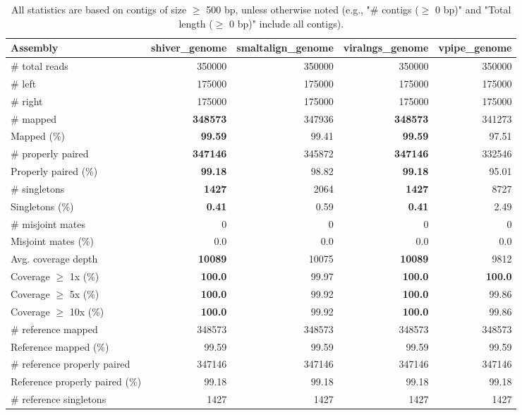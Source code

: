 \documentclass[12pt,a4paper]{article}
\begin{document}
\begin{table}[ht]
\begin{center}
\caption{All statistics are based on contigs of size $\geq$ 500 bp, unless otherwise noted (e.g., "\# contigs ($\geq$ 0 bp)" and "Total length ($\geq$ 0 bp)" include all contigs).}
\begin{tabular}{|l*{4}{|r}|}
\hline
Assembly & shiver\_genome & smaltalign\_genome & viralngs\_genome & vpipe\_genome \\ \hline
\# total reads & 350000 & 350000 & 350000 & 350000 \\ \hline
\# left & 175000 & 175000 & 175000 & 175000 \\ \hline
\# right & 175000 & 175000 & 175000 & 175000 \\ \hline
\# mapped & {\bf 348573} & 347936 & {\bf 348573} & 341273 \\ \hline
Mapped (\%) & {\bf 99.59} & 99.41 & {\bf 99.59} & 97.51 \\ \hline
\# properly paired & {\bf 347146} & 345872 & {\bf 347146} & 332546 \\ \hline
Properly paired (\%) & {\bf 99.18} & 98.82 & {\bf 99.18} & 95.01 \\ \hline
\# singletons & {\bf 1427} & 2064 & {\bf 1427} & 8727 \\ \hline
Singletons (\%) & {\bf 0.41} & 0.59 & {\bf 0.41} & 2.49 \\ \hline
\# misjoint mates & 0 & 0 & 0 & 0 \\ \hline
Misjoint mates (\%) & 0.0 & 0.0 & 0.0 & 0.0 \\ \hline
Avg. coverage depth & {\bf 10089} & 10075 & {\bf 10089} & 9812 \\ \hline
Coverage $\geq$ 1x (\%) & {\bf 100.0} & 99.97 & {\bf 100.0} & {\bf 100.0} \\ \hline
Coverage $\geq$ 5x (\%) & {\bf 100.0} & 99.92 & {\bf 100.0} & 99.86 \\ \hline
Coverage $\geq$ 10x (\%) & {\bf 100.0} & 99.92 & {\bf 100.0} & 99.86 \\ \hline
\# reference mapped & 348573 & 348573 & 348573 & 348573 \\ \hline
Reference mapped (\%) & 99.59 & 99.59 & 99.59 & 99.59 \\ \hline
\# reference properly paired & 347146 & 347146 & 347146 & 347146 \\ \hline
Reference properly paired (\%) & 99.18 & 99.18 & 99.18 & 99.18 \\ \hline
\# reference singletons & 1427 & 1427 & 1427 & 1427 \\ \hline

\end{tabular}
\end{center}
\end{table}
\end{document}
